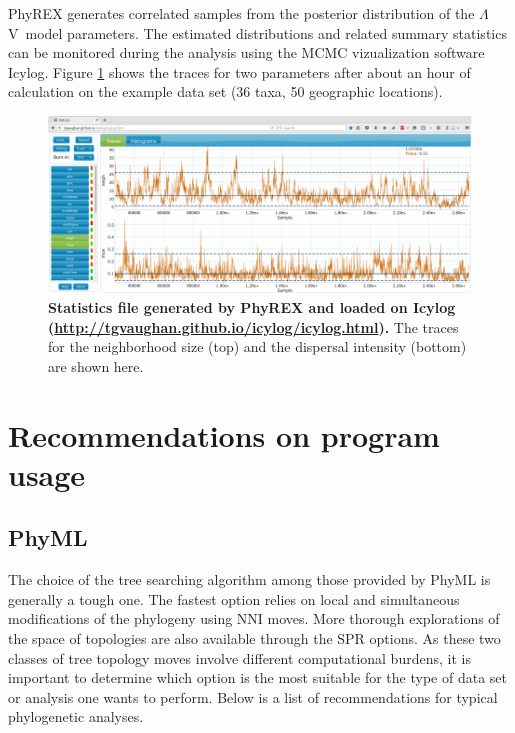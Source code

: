 \documentclass[a4paper,12pt]{article}
\newcommand{\sfv}{$\Lambda$V}
\begin{document}
PhyREX generates correlated samples from the posterior distribution of the \sfv\ model
parameters. The estimated distributions and related summary statistics can be monitored during the
analysis using the MCMC vizualization software Icylog. Figure \ref{fig:phyrextrace} shows the traces
for two parameters after about an hour of calculation on the example data set (36 taxa, 50
geographic locations).

\begin{figure}
\begin{center}
\includegraphics[width=13.8cm]{./fig/phyrexlog}
\end{center}
\caption{{\bf Statistics file generated by PhyREX and loaded on Icylog
    (\url{http://tgvaughan.github.io/icylog/icylog.html}).} The traces for the neighborhood size
  (top) and
the dispersal intensity (bottom) are shown here.} 
\label{fig:phyrextrace}
\end{figure}

\section{Recommendations on program usage}\label{sec:progusage}

\subsection{PhyML}

The choice of the  tree searching algorithm among those provided by PhyML  is generally a tough one.
The  fastest option  relies  on local  and simultaneous  modifications  of the  phylogeny using  NNI
moves. More  thorough explorations of  the space  of topologies are  also available through  the SPR
options.  As these  two classes of tree topology moves involve  different computational burdens, it
is important to determine which option is the most suitable for the type of data set or analysis one
wants to perform. Below is a list of recommendations for typical phylogenetic analyses.
\end{document}

